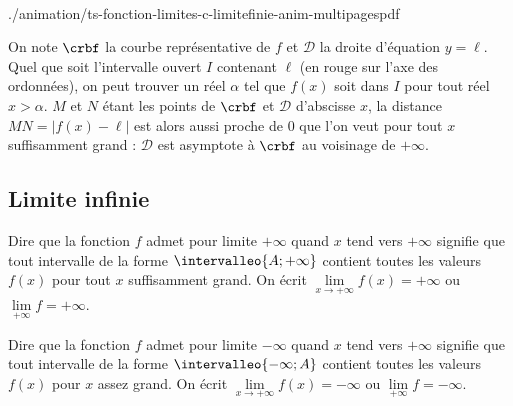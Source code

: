 \begin{intgr}\label{fct:c:intg:limite:finie:def}~\newline
\begin{minipage}{0.48\linewidth}
%
	{./animation/ts-fonction-limites-c-limitefinie-anim-multipagespdf}%
	{}{}
   \end{minipage}
\hfill
   \begin{minipage}{0.47\linewidth}%
 On note $\crbf$ la courbe représentative de $f$ et $\mathcal D$ la droite d'équation $y=\ell$.\newline
 Quel que soit l'intervalle ouvert $I$ contenant $\ell$ (en rouge sur l'axe des ordonnées), on peut trouver un réel $\alpha$ tel que $f(x)$ soit dans $I$ pour tout réel $x>\alpha$.\newline
$M$ et $N$ étant les points de $\crbf$ et $\mathcal D$ d'abscisse $x$, la distance $MN=\lvert f(x)-\ell\rvert$ est alors aussi proche de $0$ que l'on veut pour tout $x$ suffisamment grand : $\mathcal D$ est asymptote à $\crbf$ au voisinage de $+\infty$.
   \end{minipage}
\end{intgr}

\subsection{Limite infinie}

\begin{dfn}
Dire que la fonction $f$ admet pour limite $+\infty$ quand $x$ tend vers $+\infty$ signifie que tout intervalle de la forme $\intervalleo{A;+\infty}$ contient toutes les valeurs $f(x)$ pour tout $x$ suffisamment grand.\newline
On écrit $\lim\limits_{x\to +\infty} f(x)=+\infty$ ou $\lim\limits_{+\infty} f=+\infty$.
\end{dfn}

\begin{dfn}
Dire que la fonction $f$ admet pour limite $-\infty$ quand $x$ tend vers $+\infty$ signifie que tout intervalle de la forme $\intervalleo{-\infty;A}$ contient toutes les valeurs $f(x)$ pour $x$ assez grand.\newline
On écrit $\lim\limits_{x\to +\infty} f(x)=-\infty$ ou $\lim\limits_{+\infty} f=-\infty$.
\end{dfn}


